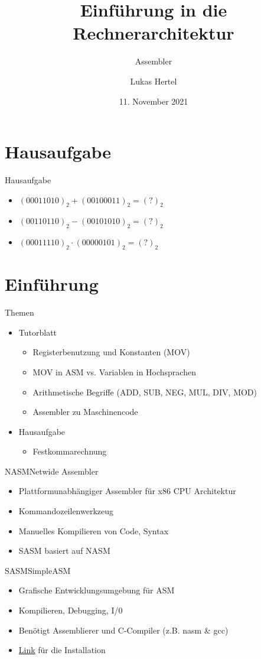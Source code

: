 \documentclass[
  german,            %
  aspectratio=169,    %
  sectionpage=false,   %
]{tumbeamer}
\title{Einführung in die Rechnerarchitektur}
\subtitle{Assembler}
\author{Lukas Hertel}
\institute{\theChairName\\\theDepartmentName\\\theUniversityName}
\date[01.11.2021]{11. November 2021}
\begin{document}
\maketitle

\section{Hausaufgabe}
\begin{frame}{Hausaufgabe}
	\begin{itemize}
		\item $(00011010)_2 + (00100011)_2 = (?)_2$
		\item $(00110110)_2 - (00101010)_2 = (?)_2$
		\item $(00011110)_2 \cdot (00000101)_2 = (?)_2$
	\end{itemize}
\end{frame}

\section{Einführung}
\begin{frame}{Themen}
	\begin{itemize}
		\item Tutorblatt
		\begin{itemize}
			\item Registerbenutzung und Konstanten (MOV)
			\item MOV in ASM vs. Variablen in Hochsprachen
			\item Arithmetische Begriffe (ADD, SUB, NEG, MUL, DIV, MOD)
			\item Assembler zu Maschinencode
		\end{itemize}
		\item Hausaufgabe
		\begin{itemize}
			\item Festkommarechnung
		\end{itemize}
	\end{itemize}
\end{frame}
\begin{frame}{NASM}{Netwide Assembler}
	\begin{itemize}
		\item Plattformunabhängiger Assembler für x86 CPU Architektur
		\item Kommandozeilenwerkzeug
		\item Manuelles Kompilieren von Code, Syntax
		\item SASM basiert auf NASM
	\end{itemize}
\end{frame}
\begin{frame}{SASM}{SimpleASM}
	\begin{itemize}
		\item Grafische Entwicklungsumgebung für ASM
		\item Kompilieren, Debugging, I/0
		\item Benötigt Assemblierer und C-Compiler (z.B. nasm \& gcc)
		\item \href{https://dman95.github.io/SASM}{Link} für die Installation
	\end{itemize}
\end{frame}
\end{document}
